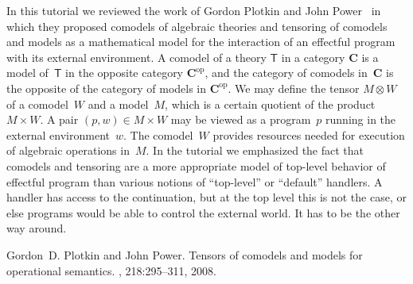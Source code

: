 \documentclass[a4paper,UKenglish]{dagrep-v2018}
\begin{document}
In this tutorial we reviewed the work of Gordon Plotkin and John
Power~\cite{plotkin08:_tensor_comod_model_operat_seman} in which they proposed
comodels of algebraic theories and tensoring of comodels and models as a
mathematical model for the interaction of an effectful program with its external
environment. A comodel of a theory $\mathsf{T}$ in a category $\mathbf{C}$ is a
model of~$\mathsf{T}$ in the opposite category $\mathbf{C}^{\mathrm{op}}$, and
the category of comodels in~$\mathbf{C}$ is the opposite of the category of
models in $\mathbf{C}^{\mathrm{op}}$. We may define the tensor $M \otimes W$ of
a comodel~$W$ and a model~$M$, which is a certain quotient of the product
$M \times W$. A pair $(p, w) \in M \times W$ may be viewed as a program~$p$
running in the external environment~$w$. The comodel~$W$ provides resources
needed for execution of algebraic operations in~$M$. In the tutorial we
emphasized the fact that comodels and tensoring are a more appropriate model of
top-level behavior of effectful program than various notions of ``top-level'' or
``default'' handlers. A handler has access to the continuation, but at the top
level this is not the case, or else programs would be able to control the
external world. It has to be the other way around.


\begin{thebibliography}{10}

Gordon~D. Plotkin and John Power.
\newblock Tensors of comodels and models for operational semantics.
, 218:295--311,
  2008.

\end{thebibliography}
\end{document}
